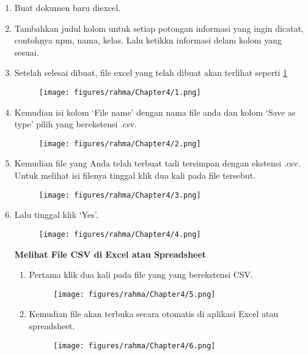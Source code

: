        \begin{enumerate}
	   \item Buat dokumen baru diexcel.
       \item Tambahkan judul kolom untuk setiap potongan informasi yang ingin dicatat, contohnya npm, nama, kelas. Lalu ketikkn informasi delam kolom yang sesuai.
	   \item Setelah selesai dibuat, file excel yang telah dibuat akan terlihat seperti \ref{CSV}
		
		\begin{figure}[h]	\texttt{[image: figures/rahma/Chapter4/1.png]}
		\centering
        \label{CSV}
		\end{figure}
		
	   \item Kemudian isi kolom `File name' dengan nama file anda dan kolom `Save as type' pilih yang berekstensi .csv.
		
		\begin{figure}[h] \texttt{[image: figures/rahma/Chapter4/2.png]}
			\centering
		\end{figure}

\item Kemudian file yang Anda telah terbuat tadi tersimpan dengan ekstensi .csv. Untuk melihat isi filenya tinggal klik dua kali pada file tersebut.
		\begin{figure}[h]	\texttt{[image: figures/rahma/Chapter4/3.png]}
			\centering
		\end{figure}
		
	   \item Lalu tinggal klik `Yes'.	
		\begin{figure}[h] \texttt{[image: figures/rahma/Chapter4/4.png]}
			\centering
		\end{figure}


   \textbf{Melihat File CSV di Excel atau Spreadsheet}
	 \begin{enumerate}
		\item Pertama klik dua kali pada file yang yang berekstensi CSV.
		
		\begin{figure}[h]	\texttt{[image: figures/rahma/Chapter4/5.png]}
			\centering
		\end{figure}
		
		\item Kemudian file akan terbuka secara otomatis di aplikasi Excel atau spreadsheet.
		
		\begin{figure}[h] \texttt{[image: figures/rahma/Chapter4/6.png]}
			\centering
		\end{figure}
	 \end{enumerate}


\end{enumerate}
